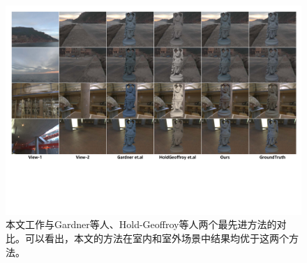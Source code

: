 \begin{figure}
  \includegraphics[width=1.0\textwidth]{Img/fig-cmp.pdf}
  \caption[与最先进方法的对比]{
    \label{fig:cmp-previous}
    本文工作与Gardner等人\cite{gardner2017learning}、Hold-Geoffroy等人\cite{hold2017deep}两个最先进方法的对比。可以看出，本文的方法在室内和室外场景中结果均优于这两个方法。
  }
\end{figure}